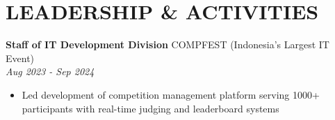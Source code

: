 \documentclass[10pt,a4paper]{article}
\newcommand{\experienceheader}[4]{
    \textbf{#1} \hfill #2 \\
    \textit{#3} \hfill \textit{#4}
}
\begin{document}
\section*{LEADERSHIP \& ACTIVITIES}

\experienceheader{Staff of IT Development Division}{COMPFEST (Indonesia's Largest IT Event)}{}{Aug 2023 - Sep 2024}
\begin{itemize}[leftmargin=*, itemsep=1pt, topsep=1pt]
    \item Led development of competition management platform serving 1000+ participants with real-time judging and leaderboard systems
\end{itemize}



\end{document}
